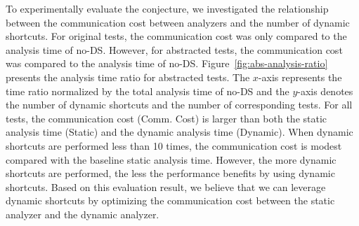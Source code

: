 To experimentally evaluate the conjecture, we investigated the relationship between
the communication cost between analyzers and the number of dynamic shortcuts.
For  original tests, the communication cost was only
 compared to the analysis time of no-DS.  However, for 
abstracted tests, the communication cost was  compared to the analysis
time of no-DS.  Figure~\ref{fig:abs-analysis-ratio} presents the
analysis time ratio for  abstracted tests.
The $x$-axis represents the time ratio normalized by the total analysis time of
no-DS and the $y$-axis denotes the number of dynamic
shortcuts and the number of corresponding tests.
For all  tests, the communication cost (Comm. Cost) is larger than
both the static analysis time (Static) and the dynamic analysis
time (Dynamic).  When dynamic shortcuts are performed less than 10 times,
the communication cost is modest compared with the baseline static
analysis time.  However, the more dynamic shortcuts are performed,
the less the performance benefits by using dynamic shortcuts.
Based on this evaluation result, we believe that we can leverage
dynamic shortcuts by optimizing the communication cost between
the static analyzer and the dynamic analyzer.

